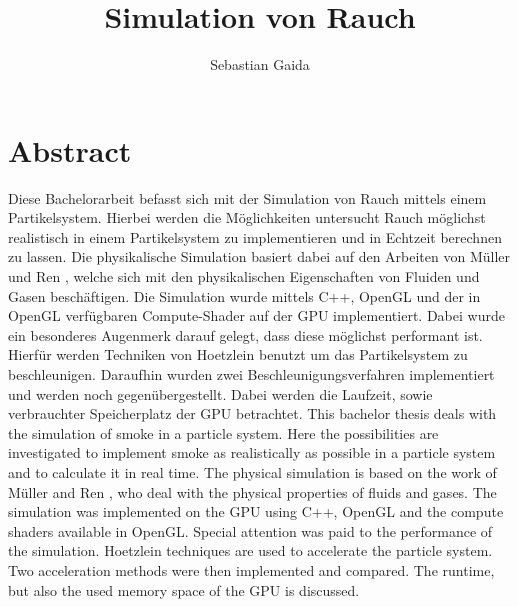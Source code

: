\documentclass[intern,palatino]{cgBA}
\author{Sebastian Gaida}
\title{Simulation von Rauch}
\begin{document}
	\maketitle
	\newpage
	
	
	
	\section*{Abstract}\label{abstract}
	
	Diese Bachelorarbeit befasst sich mit der Simulation von Rauch mittels einem Partikelsystem. Hierbei werden die Möglichkeiten untersucht Rauch möglichst realistisch in einem Partikelsystem zu implementieren und in Echtzeit berechnen zu lassen. Die physikalische Simulation basiert dabei auf den Arbeiten von  Müller \cite{muller2003particle} und Ren \cite{ren2016fast}, welche sich mit den physikalischen Eigenschaften von Fluiden und Gasen beschäftigen. Die Simulation wurde mittels C++, OpenGL und der in OpenGL verfügbaren Compute-Shader auf der GPU implementiert. Dabei wurde ein besonderes Augenmerk darauf gelegt, dass diese möglichst performant ist. Hierfür werden Techniken von Hoetzlein \cite{nvidia} benutzt um das Partikelsystem zu beschleunigen. Daraufhin wurden zwei Beschleunigungsverfahren implementiert und werden noch gegenübergestellt. Dabei werden die Laufzeit, sowie verbrauchter Speicherplatz der GPU betrachtet.
	\newline \newline
	This bachelor thesis deals with the simulation of smoke in a particle system. Here the possibilities are investigated to implement smoke as realistically as possible in a particle system and to calculate it in real time. The physical simulation is based on the work of Müller \cite{muller2003particle} and Ren \cite{ren2016fast}, who deal with the physical properties of fluids and gases. The simulation was implemented on the GPU using C++, OpenGL and the compute shaders available in OpenGL. Special attention was paid to the performance of the simulation. Hoetzlein \cite{nvidia} techniques are used to accelerate the particle system. Two acceleration methods were then implemented and compared. The runtime, but also the used memory space of the GPU is discussed.
	
	\newpage
	
	\tableofcontents
	\clearpage
	
	\captionsetup{font=it}
\end{document}
